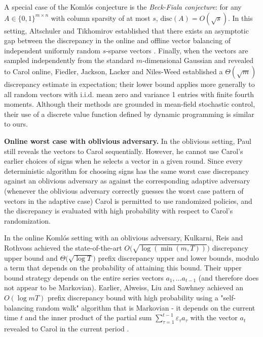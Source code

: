\documentclass[reqno]{amsart}
\numberwithin{equation}{section}
\newcommand{\eps}{\varepsilon}
\begin{document}
A special case of the Koml\'os conjecture is the \emph{Beck-Fiala conjecture}: for any $A \in \{0,1\}^{m\times n}$ with column sparsity of at most $s$,  $\text{disc}(A) = O(\sqrt {s})$\cite{BECK19811}. In this setting, Altschuler and Tikhomirov established that there exists an asymptotic gap between the discrepancy in the online and offline vector balancing of independent uniformly random $s$-sparse vectors \cite{altschuler2025thresholdonlinebalancingsparse}. Finally, when the vectors are sampled independently from the standard $m$-dimensional Gaussian    and revealed to Carol online, Fiedler, Jackson, Lacker and  Niles-Weed  established  a $\Theta (\sqrt {m})$ discrepancy estimate in expectation; their lower bound applies more generally to all random vectors with i.i.d. mean zero and variance 1 entries with finite fourth moments\cite {FJLN26}. Although their methods are grounded in mean-field stochastic control, their use of a discrete value function defined by dynamic programming is similar to ours. 
    




 
 \textbf{Online worst case with oblivious adversary.} In the oblivious setting, Paul still reveals the vectors to Carol sequentially. However,  he cannot use Carol's earlier choices of signs when he selects a vector in a given round. Since  every deterministic algorithm for choosing signs has the same  worst case discrepancy against an oblivious adversary as against the corresponding adaptive adversary (whenever the oblivious adversary correctly guesses the worst case pattern of vectors in the adaptive case) Carol is permitted to use randomized policies, and the  discrepancy is evaluated with high probability with respect to Carol's randomization. 

 In the online Koml\'os setting with an oblivious adversary, Kulkarni,  Reis and Rothvoss  achieved the state-of-the-art $O \big (\sqrt {\log (\min (m,T))}\big )$ discrepancy upper bound and $\Theta \big (\sqrt {\log T})$ prefix discrepancy upper and lower bounds, modulo a term that depends on the probability of attaining this bound\cite {KJR24}. Their upper bound strategy depends on the entire series vectors $a_1, \dots a_{t-1}$ (and therefore does not appear to be Markovian). Earlier, Alweiss, Liu and Sawhney  achieved an $O(\log mT)$ prefix discrepancy bound with high probability using a "self-balancing random walk" algorithm that is Markovian - it depends on  the current time $t$ and the inner product of the  partial sum 
 $\sum_{\tau=1}^{t-1}   \eps_{\tau} a_{\tau}$ with the vector $a_t$ revealed to Carol in the current period  \cite{ALS21}.  
\end{document}
